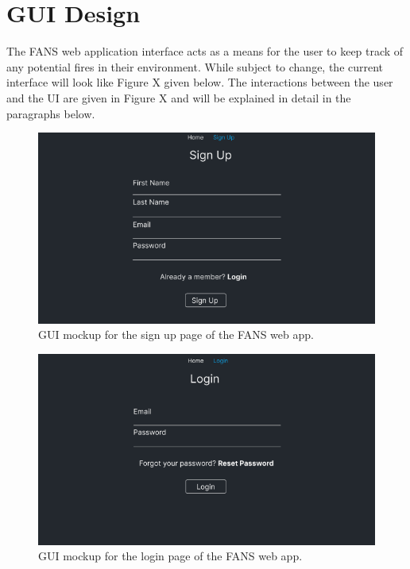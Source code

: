 \section{GUI Design}

The FANS web application interface acts as a means for the user to keep track of any potential fires in their
environment. While subject to change, the current interface will look like Figure X given below. The interactions
between the user and the UI are given in Figure X and will be explained in detail in the paragraphs below.

\begin{figure}[H]
    \centering
    \includegraphics[width=\linewidth]{../assets/SignUpPage.png}
    \caption{GUI mockup for the sign up page of the FANS web app.}
\end{figure}

\begin{figure}[H]
    \centering
    \includegraphics[width=\linewidth]{../assets/LoginPage.png}
    \caption{GUI mockup for the login page of the FANS web app.}
\end{figure}

